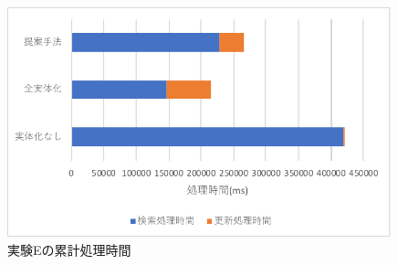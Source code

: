 \documentclass[a4paper,11pt]{ujreport}
\begin{document}
\begin{figure}[htbp]
	\begin{center}
		\includegraphics[width=30em]{src/ExperimentE-total.pdf} %
	\end{center}
	\caption{実験Eの累計処理時間}
	\label{figure:ExperimentE-total}
\end{figure}
\end{document}
